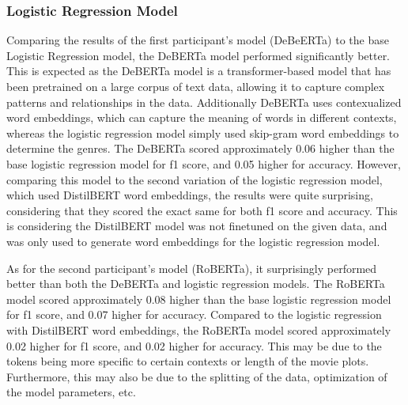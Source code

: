 \subsubsection{Logistic Regression Model}

Comparing the results of the first participant's model (DeBeERTa) to the base Logistic Regression model, the DeBERTa model performed significantly better. 
This is expected as the DeBERTa model is a transformer-based model that has been pretrained on a large corpus of text data, allowing it to capture complex patterns and relationships in the data.
Additionally DeBERTa uses contexualized word embeddings, which can capture the meaning of words in different contexts, whereas the logistic regression model simply used skip-gram word embeddings to determine the genres.
The DeBERTa scored approximately 0.06 higher than the base logistic regression model for f1 score, and 0.05 higher for accuracy.
However, comparing this model to the second variation of the logistic regression model, which used DistilBERT word embeddings, the results were quite surprising, considering that they scored the exact same for both f1 score and accuracy.
This is considering the DistilBERT model was not finetuned on the given data, and was only used to generate word embeddings for the logistic regression model.

As for the second participant's model (RoBERTa), it surprisingly performed better than both the DeBERTa and logistic regression models. 
The RoBERTa model scored approximately 0.08 higher than the base logistic regression model for f1 score, and 0.07 higher for accuracy.
Compared to the logistic regression with DistilBERT word embeddings, the RoBERTa model scored approximately 0.02 higher for f1 score, and 0.02 higher for accuracy.
This may be due to the tokens being more specific to certain contexts or length of the movie plots. 
Furthermore, this may also be due to the splitting of the data, optimization of the model parameters, etc.
